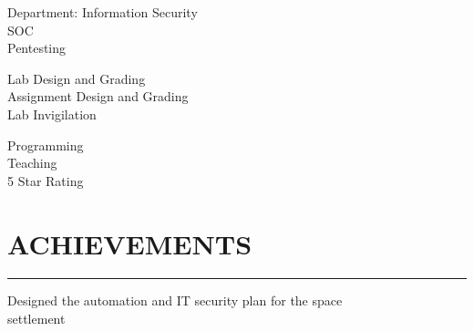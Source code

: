 \documentclass[]{resume}
\begin{document}
\begin{minipage}[t]{0.66\textwidth}
    \vspace{-8pt}
    \hspace{5em}
    \begin{minipage}{0.85\textwidth\vspace{2pt}}
        Department: Information Security\\
        SOC\\
        Pentesting
    \end{minipage}


    \vspace{8pt}
     
    \noindent

    \vspace{-8pt}
    \hspace{5 em}
    \begin{minipage}{0.85\textwidth\vspace{2pt}}
        Lab Design and Grading\\
        Assignment Design and Grading\\
        Lab Invigilation
    \end{minipage}

    \vspace{8pt}
     
    \noindent

    \vspace{-5pt}
    \hspace{5 em}
    \begin{minipage}{0.85\textwidth\vspace{2pt}}
        Programming\\
        Teaching\\
        5 Star Rating
    \end{minipage}



    \section{ACHIEVEMENTS}
    \noindent\rule{12.5 cm}{0.4pt}

     
    \vspace{4pt}
    \begin{minipage}{0.85\textwidth\vspace{4pt}}
        Designed the automation and IT security plan for the space\\settlement
    \end{minipage}


\end{minipage}
\end{document}
